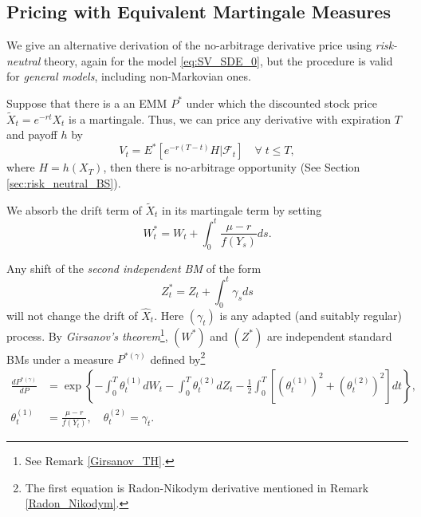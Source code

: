 \documentclass[a4paper,12pt]{article}
\numberwithin{equation}{section}
\theoremstyle{definition}
\theoremstyle{remark}
\begin{document}
\subsection{Pricing with Equivalent Martingale Measures}
\label{sec:sv_emm}

We give an alternative derivation of the no-arbitrage derivative 
price using \textit{risk-neutral} theory, again for the model 
\eqref{eq:SV_SDE_0}, but the procedure is valid for 
\textit{general models}, including non-Markovian ones.

Suppose that there is a an EMM $P^{*}$ under which the discounted 
stock price $\widetilde{X}_{t}=e^{-rt}X_{t}$ is a martingale. Thus, 
we can price any derivative with expiration $T$ and payoff $h$ by 
\begin{equation}
    V_{t}=E^{*}[e^{-r(T-t)}H|\mathcal{F}_{t}]\quad \forall\;t\leq T,
\end{equation}
where $H=h(X_{T})$, then there is no-arbitrage opportunity (See 
Section \ref{sec:risk_neutral_BS}).

We absorb the drift term of $\widetilde{X}_{t}$ in its martingale 
term by setting 
\begin{equation}
    W_{t}^{*}=W_{t}+\int_{0}^{t} \frac{\mu-r}{f(Y_{s})} ds.
\end{equation}

Any shift of the \textit{second independent BM} of the form 
\begin{equation}
    Z_{t}^{*}=Z_{t}+\int_{0}^{t} \gamma_{s} ds
\end{equation}
will not change the drift of $\widehat{X}_{t}$. Here $(\gamma_{t})$ 
is any adapted (and suitably regular) process. By \textit{
Girsanov's theorem}\footnote{See Remark \ref{Girsanov_TH}.}, 
$(W^{*})$ and $(Z^{*})$ are independent standard BMs under a 
measure $P^{*(\gamma)}$ defined by\footnote{The first equation is 
Radon-Nikodym derivative mentioned in Remark \ref{Radon_Nikodym}.}
\begin{equation}
    \begin{split}
        \frac{d P^{*(\gamma)}}{d P}&=\exp
        \left\{-\int_{0}^{T} \theta_{t}^{(1)} dW_{t}
        -\int_{0}^{T} \theta_{t}^{(2)} dZ_{t}
        -\frac{1}{2}
        \int_{0}^{T} [(\theta_{t}^{(1)})^{2}+
        (\theta_{t}^{(2)})^{2}] dt\right\}, \\
        \theta_{t}^{(1)}&=\frac{\mu-r}{f(Y_{t})},\quad
        \theta_{t}^{(2)}=\gamma_{t}.
    \end{split}
\end{equation}
\end{document}
